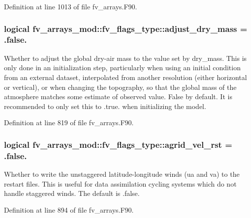 Definition at line 1013 of file fv\-\_\-arrays.\-F90.

\subsubsection[{adjust\-\_\-dry\-\_\-mass}]{\setlength{\rightskip}{0pt plus 5cm}logical fv\-\_\-arrays\-\_\-mod\-::fv\-\_\-flags\-\_\-type\-::adjust\-\_\-dry\-\_\-mass = .false.}\label{structfv__arrays__mod_1_1fv__flags__type_a85c6e8042f8613458bc65a948aaa0125}


Whether to adjust the global dry-\/air mass to the value set by dry\-\_\-mass. This is only done in an initialization step, particularly when using an initial condition from an external dataset, interpolated from another resolution (either horizontal or vertical), or when changing the topography, so that the global mass of the atmosphere matches some estimate of observed value. False by default. It is recommended to only set this to .true. when initializing the model. 



Definition at line 819 of file fv\-\_\-arrays.\-F90.

\subsubsection[{agrid\-\_\-vel\-\_\-rst}]{\setlength{\rightskip}{0pt plus 5cm}logical fv\-\_\-arrays\-\_\-mod\-::fv\-\_\-flags\-\_\-type\-::agrid\-\_\-vel\-\_\-rst = .false.}\label{structfv__arrays__mod_1_1fv__flags__type_ad92b88b93aa90000c07053c042c1d310}


Whether to write the unstaggered latitude-\/longitude winds (ua and va) to the restart files. This is useful for data assimilation cycling systems which do not handle staggered winds. The default is .false. 



Definition at line 894 of file fv\-\_\-arrays.\-F90.

